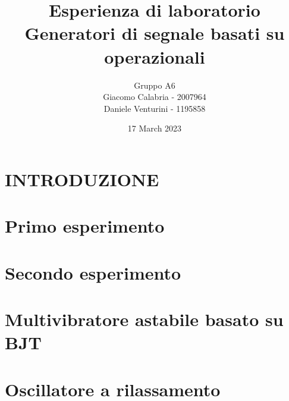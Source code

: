 \documentclass{article}
\title{Esperienza di laboratorio\\\textbf{Generatori di segnale basati su operazionali}}
\author{Gruppo A6\\Giacomo Calabria - 2007964\\Daniele Venturini - 1195858}
\date{17 March 2023}
\begin{document}
    \maketitle
    \tableofcontents
    \clearpage
    \section*{INTRODUZIONE}
    
    \clearpage
    
    \section{Primo esperimento}
    
    \clearpage
    
    \section{Secondo esperimento}
    
    \clearpage
    
    \section{Multivibratore astabile basato su BJT}
    
    \clearpage

    \section{Oscillatore a rilassamento}
    
\end{document}
